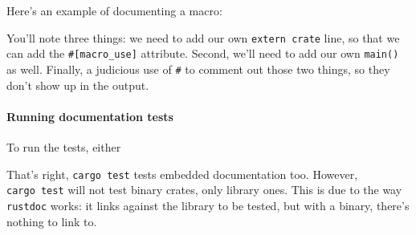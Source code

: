 \documentclass[a4paper,]{book}
\newenvironment{Shaded}{\begin{snugshade}}{\end{snugshade}}
\newcommand{\KeywordTok}[1]{\textcolor[rgb]{0.13,0.29,0.53}{\textbf{{#1}}}}
\newcommand{\CommentTok}[1]{\textcolor[rgb]{0.56,0.35,0.01}{\textit{{#1}}}}
\newcommand{\OtherTok}[1]{\textcolor[rgb]{0.56,0.35,0.01}{{#1}}}
\newcommand{\NormalTok}[1]{{#1}}
\begin{document}
Here's an example of documenting a macro:

\begin{Shaded}
\end{Shaded}

You'll note three things: we need to add our own \texttt{extern\ crate}
line, so that we can add the \texttt{\#{[}macro\_use{]}} attribute.
Second, we'll need to add our own \texttt{main()} as well. Finally, a
judicious use of \texttt{\#} to comment out those two things, so they
don't show up in the output.

\paragraph{Running documentation
tests}\label{running-documentation-tests}

To run the tests, either

\begin{Shaded}
\end{Shaded}

That's right, \texttt{cargo\ test} tests embedded documentation too.
However, \texttt{cargo\ test} will not test binary crates, only library
ones. This is due to the way \texttt{rustdoc} works: it links against
the library to be tested, but with a binary, there's nothing to link to.
\end{document}
